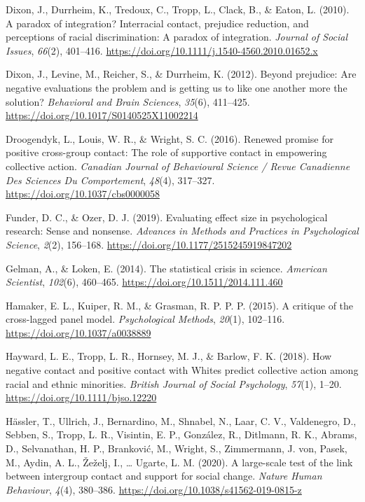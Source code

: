 \documentclass[12pt, letterpaper]{article}
\begin{document}
\leavevmode\hypertarget{ref-dixon_paradox_2010}{}%
Dixon, J., Durrheim, K., Tredoux, C., Tropp, L., Clack, B., \& Eaton, L.
(2010). A paradox of integration? Interracial contact, prejudice
reduction, and perceptions of racial discrimination: A paradox of
integration. \emph{Journal of Social Issues}, \emph{66}(2), 401--416.
\url{https://doi.org/10.1111/j.1540-4560.2010.01652.x}

\leavevmode\hypertarget{ref-dixon_beyond_2012}{}%
Dixon, J., Levine, M., Reicher, S., \& Durrheim, K. (2012). Beyond
prejudice: Are negative evaluations the problem and is getting us to
like one another more the solution? \emph{Behavioral and Brain
Sciences}, \emph{35}(6), 411--425.
\url{https://doi.org/10.1017/S0140525X11002214}

\leavevmode\hypertarget{ref-droogendyk_renewed_2016}{}%
Droogendyk, L., Louis, W. R., \& Wright, S. C. (2016). Renewed promise
for positive cross-group contact: The role of supportive contact in
empowering collective action. \emph{Canadian Journal of Behavioural
Science / Revue Canadienne Des Sciences Du Comportement}, \emph{48}(4),
317--327. \url{https://doi.org/10.1037/cbs0000058}

\leavevmode\hypertarget{ref-funder_evaluating_2019}{}%
Funder, D. C., \& Ozer, D. J. (2019). Evaluating effect size in
psychological research: Sense and nonsense. \emph{Advances in Methods
and Practices in Psychological Science}, \emph{2}(2), 156--168.
\url{https://doi.org/10.1177/2515245919847202}

\leavevmode\hypertarget{ref-gelman_statistical_2014}{}%
Gelman, A., \& Loken, E. (2014). The statistical crisis in science.
\emph{American Scientist}, \emph{102}(6), 460--465.
\url{https://doi.org/10.1511/2014.111.460}

\leavevmode\hypertarget{ref-hamaker_critique_2015}{}%
Hamaker, E. L., Kuiper, R. M., \& Grasman, R. P. P. P. (2015). A
critique of the cross-lagged panel model. \emph{Psychological Methods},
\emph{20}(1), 102--116. \url{https://doi.org/10.1037/a0038889}

\leavevmode\hypertarget{ref-hayward_how_2018}{}%
Hayward, L. E., Tropp, L. R., Hornsey, M. J., \& Barlow, F. K. (2018).
How negative contact and positive contact with Whites predict collective
action among racial and ethnic minorities. \emph{British Journal of
Social Psychology}, \emph{57}(1), 1--20.
\url{https://doi.org/10.1111/bjso.12220}

\leavevmode\hypertarget{ref-hassler_large-scale_2020}{}%
Hässler, T., Ullrich, J., Bernardino, M., Shnabel, N., Laar, C. V.,
Valdenegro, D., Sebben, S., Tropp, L. R., Visintin, E. P., González, R.,
Ditlmann, R. K., Abrams, D., Selvanathan, H. P., Branković, M., Wright,
S., Zimmermann, J. von, Pasek, M., Aydin, A. L., Žeželj, I., \ldots{}
Ugarte, L. M. (2020). A large-scale test of the link between intergroup
contact and support for social change. \emph{Nature Human Behaviour},
\emph{4}(4), 380--386. \url{https://doi.org/10.1038/s41562-019-0815-z}
\end{document}
